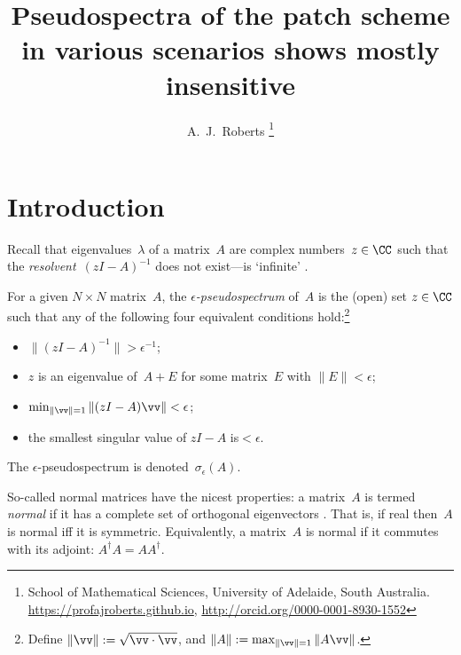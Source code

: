 \documentclass[11pt,a5paper]{article}
\title{Pseudospectra of the patch scheme in various scenarios shows mostly insensitive}
\author{A.~J.~Roberts%
\thanks{School of Mathematical Sciences, University of Adelaide, South Australia.
\url{https://profajroberts.github.io},
\url{http://orcid.org/0000-0001-8930-1552}}
}
\makeatletter
\def\fancyvrbStartStop{%
  \edef\FancyVerbStartString{\@percentchar\@charrb} 
  \edef\FancyVerbStopString{\@percentchar\@charlb} }
\makeatother
\begin{document}
\fancyvrbStartStop

\maketitle

\tableofcontents


\section{Introduction}

Recall that eigenvalues~\(\lambda\) of a matrix~\(A\) are complex numbers~\(z\in\CC\) such that the \emph{resolvent}~\((zI-A)^{-1}\) does not exist---is `infinite' \citep[p.3]{Trefethen2005}.

\begin{definition}
For a given \(N\times N\) matrix~\(A\), the \emph{\(\epsilon\)-pseudospectrum} of~\(A\) is the (open) set \(z\in\CC\) such that \citep[pp.13--17]{Trefethen2005} any of the following four equivalent conditions hold:\footnote{Define \(\|\vv\|:=\sqrt{\vv\cdot\vv}\), and  \(\|A\|:=\max_{\|\vv\|=1}\|A\vv\|\).}\begin{itemize}
\item \(\|(zI-A)^{-1}\|>\epsilon^{-1}\);
\item \(z\) is an eigenvalue of~\(A+E\) for some matrix~\(E\) with \(\|E\|<\epsilon\);
\item \(\min_{\|\vv\|=1}\|(zI-A)\vv\|<\epsilon\);
\item the smallest singular value of \(zI-A\) is\({}<\epsilon\).
\end{itemize}
The \(\epsilon\)-pseudospectrum is denoted~\(\sigma_\epsilon(A)\).
\end{definition}

So-called normal matrices have the nicest properties: a matrix~\(A\) is termed \emph{normal} if it has a complete set of orthogonal eigenvectors \citep[p.18]{Trefethen2005}.   
That is, if real then~\(A\) is normal iff it is symmetric.  
Equivalently, a matrix~\(A\) is normal if it commutes with its adjoint: \(A^\dag A=AA^\dag\).
\end{document}
